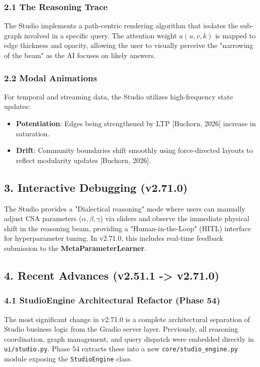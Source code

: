 \subsubsection*{2.1 The Reasoning Trace}
The Studio implements a path-centric rendering algorithm that isolates the sub-graph involved in a specific query. The attention weight $a(u,v,k)$ is mapped to edge thickness and opacity, allowing the user to visually perceive the "narrowing of the beam" as the AI focuses on likely answers.

\subsubsection*{2.2 Modal Animations}
For temporal and streaming data, the Studio utilizes high-frequency state updates:
\begin{itemize}
  \item \textbf{Potentiation}: Edges being strengthened by LTP [Buchorn, 2026] increase in saturation.
  \item \textbf{Drift}: Community boundaries shift smoothly using force-directed layouts to reflect modularity updates [Buchorn, 2026].
\end{itemize}


\subsection*{3. Interactive Debugging (v2.71.0)}
The Studio provides a "Dialectical reasoning" mode where users can manually adjust CSA parameters ($\alpha, \beta, \gamma$) via sliders and observe the immediate physical shift in the reasoning beam, providing a "Human-in-the-Loop" (HITL) interface for hyperparameter tuning. In v2.71.0, this includes real-time feedback submission to the \textbf{MetaParameterLearner}.

\subsection*{4. Recent Advances (v2.51.1 -> v2.71.0)}

\subsubsection*{4.1 StudioEngine Architectural Refactor (Phase 54)}
The most significant change in v2.71.0 is a complete architectural separation of Studio business logic from the Gradio server layer. Previously, all reasoning coordination, graph management, and query dispatch were embedded directly in \texttt{ui/studio.py}. Phase 54 extracts these into a new \texttt{core/studio\_engine.py} module exposing the \texttt{StudioEngine} class.

